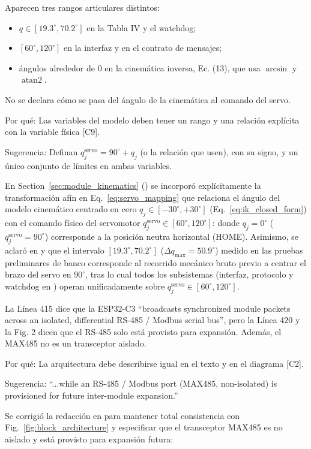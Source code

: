 \documentclass{LabDSTresponse}
\begin{document}
{Aparecen tres rangos articulares distintos:
\begin{itemize}
    \item $q \in [19.3^\circ, 70.2^\circ]$ en la Tabla IV y el watchdog;
    \item $[60^\circ, 120^\circ]$ en la interfaz y en el contrato de mensajes;
    \item ángulos alrededor de $0$ en la cinemática inversa, Ec. (13), que usa $\arcsin$ y $\operatorname{atan2}$.
\end{itemize}
No se declara cómo se pasa del ángulo de la cinemática al comando del servo.

Por qué: Las variables del modelo deben tener un rango y una relación explícita con la variable física [C9].

Sugerencia: Definan $q_j^{\text{servo}} = 90^\circ + q_j$ (o la relación que usen), con su signo, y un único conjunto de límites en ambas variables.}
{En Section~\ref{sec:module_kinematics} () se incorporó explícitamente la transformación afín en Eq.~\eqref{eq:servo_mapping} que relaciona el ángulo del modelo cinemático centrado en cero $q_j \in [-30^\circ, +30^\circ]$ (Eq.~\eqref{eq:ik_closed_form}) con el comando físico del servomotor $q_j^{\text{servo}} \in [60^\circ, 120^\circ]$:
donde $q_j = 0^\circ$ ($q_j^{\text{servo}} = 90^\circ$) corresponde a la posición neutra horizontal (HOME). Asimismo, se aclaró en  y  que el intervalo $[19.3^\circ, 70.2^\circ]$ ($\Delta q_{\max} = 50.9^\circ$) medido en las pruebas preliminares de banco corresponde al recorrido mecánico bruto previo a centrar el brazo del servo en $90^\circ$, tras lo cual todos los subsistemas (interfaz, protocolo y watchdog en ) operan unificadamente sobre $q_j^{\text{servo}} \in [60^\circ, 120^\circ]$.}

{La Línea 415 dice que la ESP32-C3 “broadcasts synchronized module packets across an isolated, differential RS-485 / Modbus serial bus”, pero la Línea 420 y la Fig. 2 dicen que el RS-485 solo está provisto para expansión. Además, el MAX485 no es un transceptor aislado.

Por qué: La arquitectura debe describirse igual en el texto y en el diagrama [C2].

Sugerencia: “...while an RS-485 / Modbus port (MAX485, non-isolated) is provisioned for future inter-module expansion.”}
{Se corrigió la redacción en  para mantener total consistencia con Fig.~\ref{fig:block_architecture} y especificar que el transceptor MAX485 es no aislado y está provisto para expansión futura:
}
\end{document}
